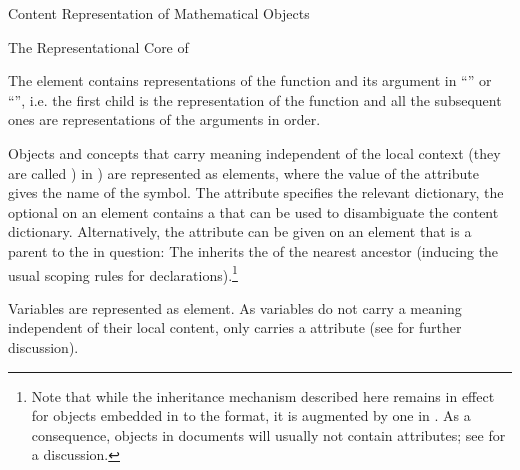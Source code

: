 \begin{omgroup}[id=mobj,short=Mathematical Objects]
\begin{omgroup}[id=mobj.core]{Content Representation of Mathematical Objects}
\begin{module}[id=OpenMath]
\begin{omgroup}[id=openmath]{The Representational Core of \openmath}
\begin{definition}
  The  element contains representations of the function and its
  argument in ``'' or ``{}'',
  i.e. the first child is the representation of the function and all the subsequent ones
  are representations of the arguments in order.
\end{definition}

\begin{definition}
  Objects and concepts that carry meaning independent of the local context (they are
  called ) in {\openmath}) are represented as 
  elements, where the value of the  attribute gives the
  name of the symbol.  The  attribute specifies the relevant
   {dictionary}, the optional  on an
   element contains a {} that can be used to
  disambiguate the content dictionary.  Alternatively, the {}
  attribute can be given on an {\openmath} element that is a parent to the
   in question: The  inherits the
  {} of the nearest ancestor (inducing the usual {\xml} scoping
  rules for declarations).\footnote{Note that while the {}
    inheritance mechanism described here remains in effect for {\openmath} objects
    embedded in to the \omdoc format, it is augmented by one in \omdoc. As a consequence,
    {\openmath} objects in \omdoc documents will usually not contain
    {} attributes; see  for a discussion.}
\end{definition}

\begin{definition}
  Variables are represented as  element.  As variables do not carry
  a meaning independent of their local content,  only carries a
   attribute (see  for further
  discussion).
\end{definition}


\end{omgroup}
\end{module}
\end{omgroup}
\end{omgroup}
